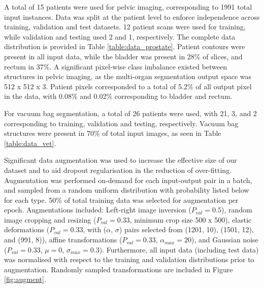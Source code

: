 A total of 15 patients were used for pelvic imaging, corresponding to 1991 total
input instances. Data was split at the patient level to enforce independence
across training, validation and test datasets. 12 patient scans were used for
training, while validation and testing used 2 and 1, respectively. The complete
data distribution is provided in Table \ref{table:data_prostate}. Patient
contours were present in all input data, while the bladder was present in 28\%
of slices, and rectum in 37\%. A significant pixel-wise class imbalance existed
between structures in pelvic imaging, as the multi-organ segmentation output
space was 512 x 512 x 3. Patient pixels corresponded to a total of 5.2\% of all
output pixel in the data, with 0.08\% and 0.02\% corresponding to bladder and
rectum.



For vacuum bag segmentation, a total of 26 patients were used, with 21, 3, and 2
corresponding to training, validation and testing, respectively. Vacuum bag
structures were present in 70\% of total input images, as seen in Table
\ref{table:data_vet}.




Significant data augmentation was used to increase the effective size of our
dataset and to aid dropout regularisation in the reduction of over-fitting.
Augmentation was performed on-demand for each input-output pair in a batch, and
sampled from a random uniform distribution with probability listed below for
each type. 50\% of total training data was selected for augmentation per epoch.
Augmentations included: Left-right image inversion ($P_{val}=0.5$), random image
cropping and resizing ($P_{val}=0.33$, minimum crop size 500 x 500), elastic
deformations ($P_{val}=0.33$, with ($\alpha$, $\sigma$) pairs selected from
(1201, 10), (1501, 12), and (991, 8)), affine transformations ($P_{val}=0.33$,
$\alpha_{max}=20$), and Gaussian noise ($P_{val}=0.33$, $\mu=0$,
$\sigma_{max}=0.3$). Furthermore, all input data (including test data) was
normalised with respect to the training and validation distributions prior to
augmentation. Randomly sampled transformations are included in Figure
\ref{fig:augment}.

